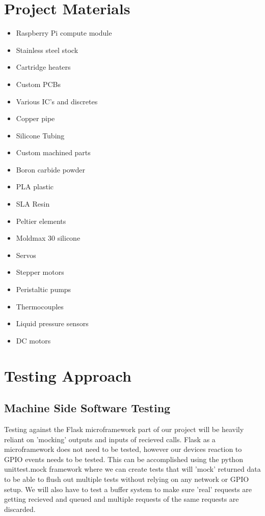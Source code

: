 \documentclass[conference]{IEEEtran}
\begin{document}
\section{Project Materials}
\begin{itemize}
\item Raspberry Pi compute module
\item Stainless steel stock
\item Cartridge heaters
\item Custom PCBs
\item Various IC's and discretes %
\item Copper pipe
\item Silicone Tubing
\item Custom machined parts
\item Boron carbide powder
\item PLA plastic
\item SLA Resin
\item Peltier elements
\item Moldmax 30 silicone
\item Servos
\item Stepper motors
\item Peristaltic pumps
\item Thermocouples
\item Liquid pressure sensors
\item DC motors
\end{itemize}


\section{Testing Approach}

\subsection{Machine Side Software Testing}
Testing against the Flask microframework part of our project will be heavily reliant on 'mocking'
outputs and inputs of recieved calls. Flask as a microframework does not need to be tested, however
our devices reaction to GPIO events needs to be tested. This can be accomplished
using the python unittest.mock framework  \cite{mock} where we can create tests that will 'mock' returned data to
be able to flush out multiple tests without relying on any network or GPIO setup. We will also have to 
test a buffer system to make sure 'real' requests are getting recieved and queued and multiple requests
of the same requests are discarded.
\end{document}
